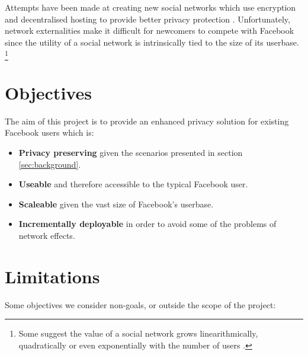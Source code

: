 Attempts have been made at creating new social networks which use encryption and decentralised hosting to provide better privacy protection \cite{pidder} \cite{diaspora}. Unfortunately, network externalities make it difficult for newcomers to compete with Facebook since the utility of a social network is intrinsically tied to the size of its userbase. \footnote{Some suggest the value of a social network grows linearithmically, quadratically or even exponentially with the number of users \cite{fb-network} \cite{metcalf}.}


\section{Objectives}
\label{sec:objectives}

The aim of this project is to provide an enhanced privacy solution for existing Facebook users which is:

\begin{itemize}

    \item \textbf{Privacy preserving} given the scenarios presented in section \ref{sec:background}.

    \item \textbf{Useable} and therefore accessible to the typical Facebook user.

    \item \textbf{Scaleable} given the vast size of Facebook's userbase. 
    
    \item \textbf{Incrementally deployable} in order to avoid some of the problems of network effects.

\end{itemize}


\section{Limitations}
\label{sec:limit}

Some objectives we consider non-goals, or outside the scope of the project:

